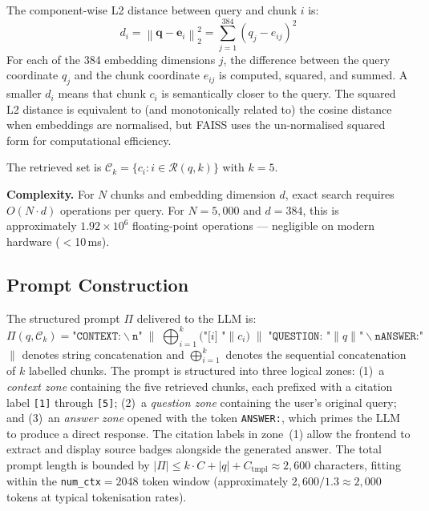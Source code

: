 \documentclass[conference]{IEEEtran}
\begin{document}
The component-wise L2 distance between query and chunk $i$ is:
\begin{equation}
  d_i = \left\|\mathbf{q} - \mathbf{e}_i\right\|_2^2
      = \sum_{j=1}^{384}\!\left(q_j - e_{ij}\right)^2
  \label{eq:l2}
\end{equation}
For each of the 384 embedding dimensions $j$, the difference between
the query coordinate $q_j$ and the chunk coordinate $e_{ij}$ is
computed, squared, and summed.
A smaller $d_i$ means that chunk $c_i$ is semantically closer to the
query.
The squared L2 distance is equivalent to (and monotonically related to)
the cosine distance when embeddings are normalised, but FAISS uses
the un-normalised squared form for computational efficiency.

The retrieved set is $\mathcal{C}_k = \{c_i : i \in \mathcal{R}(q,k)\}$
with $k=5$.

\textbf{Complexity.}
For $N$ chunks and embedding dimension $d$, exact search requires
$O(N{\cdot}d)$ operations per query.
For $N=5{,}000$ and $d=384$, this is approximately
$1.92{\times}10^6$ floating-point operations --- negligible on modern
hardware ($<$10\,ms).

\subsection{Prompt Construction}
The structured prompt $\Pi$ delivered to the LLM is:
\begin{equation}
  \Pi(q,\mathcal{C}_k) =
  \texttt{"CONTEXT:}\backslash\texttt{n"} \;\|\;
  \bigoplus_{i=1}^{k} \bigl(\texttt{"[}i\texttt{] "} \| c_i\bigr)
  \;\|\; \texttt{"QUESTION: "} \| q \| \texttt{"}\backslash\texttt{nANSWER:"}
  \label{eq:prompt}
\end{equation}
$\|$ denotes string concatenation and $\bigoplus_{i=1}^{k}$ denotes
the sequential concatenation of $k$ labelled chunks.
The prompt is structured into three logical zones:
(1)~a \emph{context zone} containing the five retrieved chunks, each
    prefixed with a citation label \texttt{[1]} through \texttt{[5]};
(2)~a \emph{question zone} containing the user's original query; and
(3)~an \emph{answer zone} opened with the token \texttt{ANSWER:},
    which primes the LLM to produce a direct response.
The citation labels in zone~(1) allow the frontend to extract and
display source badges alongside the generated answer.
The total prompt length is bounded by
$|\Pi| \leq k{\cdot}C + |q| + C_{\mathrm{tmpl}} \approx 2{,}600$
characters, fitting within the \texttt{num\_ctx}$=2048$ token window
(approximately $2{,}600 / 1.3 \approx 2{,}000$ tokens at typical
tokenisation rates).
\end{document}
